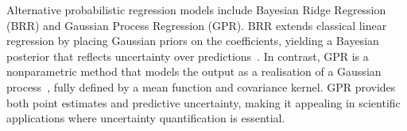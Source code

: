 \newpage
Alternative probabilistic regression models include Bayesian Ridge Regression
(BRR) and Gaussian Process Regression (GPR). BRR extends classical linear
regression by placing Gaussian priors on the coefficients, yielding a
Bayesian posterior that reflects uncertainty over predictions~\cite{Tipping2001}.
In contrast, GPR is a nonparametric method that models the output as a
realisation of a Gaussian process~\cite{Rasmussen2006}, fully defined by a mean
function and covariance kernel. GPR provides both point estimates and
predictive uncertainty, making it appealing in scientific
applications where uncertainty quantification is essential.


